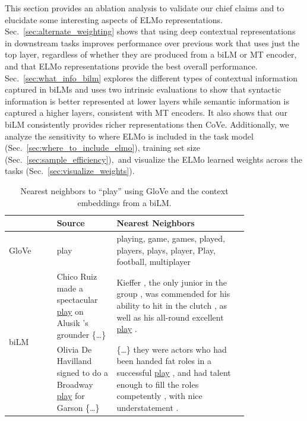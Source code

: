\documentclass[11pt,a4paper]{article}
\newcommand{\ELMO}{ELMo}
\begin{document}
This section provides an ablation analysis to validate our chief claims and to elucidate some interesting aspects of \ELMO{} representations.
Sec.~\ref{sec:alternate_weighting} shows that using deep contextual representations in downstream tasks improves performance over previous work that uses just the top layer, regardless of whether they are produced from a biLM or MT encoder, and that \ELMO{} representations provide the best overall performance. 
Sec.~\ref{sec:what_info_bilm} explores the different types of contextual information captured in biLMs and uses two intrinsic evaluations to show that syntactic information is better represented at lower layers while semantic information is captured a higher layers, consistent with MT encoders.
It also shows that our biLM consistently provides richer representations then CoVe.
Additionally, we analyze the sensitivity to where \ELMO{} is included in the task model (Sec.~\ref{sec:where_to_include_elmo}), training set size (Sec.~\ref{sec:sample_efficiency}),~and visualize the \ELMO{} learned weights across the tasks (Sec.~\ref{sec:visualize_weights}). 

\begin{table}   
\centering
\begin{tabular}{lm{0.25\linewidth}|m{0.55\linewidth}} \\
 & Source & Nearest Neighbors \\ \hline \hline
GloVe & play & playing, game, games, played, players, plays, player, Play, football, multiplayer \\ \hline
\multirow{2}{*}[-3ex]{biLM} & Chico Ruiz made a spectacular \underline{play} on Alusik 's grounder \{\ldots\}
& Kieffer , the only junior in the group , was commended for his ability to hit in the clutch , as well as his all-round excellent \underline{play} . \\ \cline{2-3}
& Olivia De Havilland signed to do a Broadway \underline{play} for Garson \{\ldots\}
& \{\ldots\} they were actors who had been handed fat roles in a successful \underline{play} , and had talent enough to fill the roles competently , with nice understatement . \\ 
\end{tabular}
\caption{Nearest neighbors to ``play'' using GloVe and the context embeddings from a biLM.}
\label{table:nearest_neighbors}
\end{table}  
\end{document}
